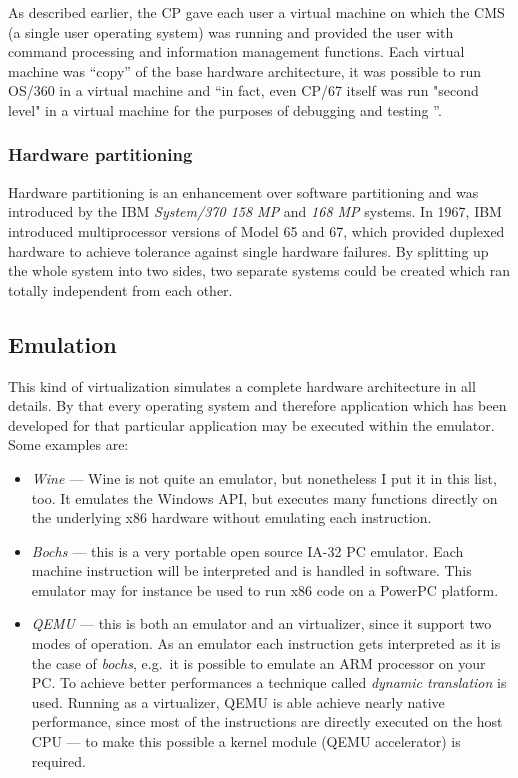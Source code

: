 As described earlier, the CP gave each user a virtual machine on which the
CMS (a  single user  operating system) was  running and provided  the user
with command processing and information management functions. Each virtual
machine was ``copy'' of the base hardware architecture, it was possible to
run OS/360 in  a virtual machine and ``in fact, even  CP/67 itself was run
"second  level" in a  virtual machine  for the  purposes of  debugging and
testing \cite{borden89}''.

\subsubsection{Hardware partitioning}
\label{sec:hardw-part}

Hardware partitioning is an enhancement over software partitioning and was
introduced  by  the  IBM   \emph{System/370  158  MP}  and  \emph{168  MP}
systems. In 1967,  IBM introduced multiprocessor versions of  Model 65 and
67, which  provided duplexed hardware to achieve  tolerance against single
hardware failures.  By  splitting up the whole system  into two sides, two
separate systems could be created  which ran totally independent from each
other.

\subsection{Emulation}
\label{sec:emulation}

This kind of virtualization  simulates a complete hardware architecture in
all  details. By  that every  operating system  and  therefore application
which has been  developed for that particular application  may be executed
within the emulator. Some examples are:
\begin{itemize}
\item  \emph{Wine \cite{wine}}  --- Wine  is  not quite  an emulator,  but
  nonetheless I put it in this list, too. It emulates the Windows API, but
  executes many functions directly  on the underlying x86 hardware without
  emulating each instruction.
\item \emph{Bochs  \cite{bochs}} --- this  is a very portable  open source
  IA-32 PC emulator.  Each machine  instruction will be interpreted and is
  handled in software.  This emulator may for instance be  used to run x86
  code on a PowerPC platform.
\item  \emph{QEMU  \cite{qemu}} ---  this  is  both  an emulator  and  an
  virtualizer, since  it support  two modes of  operation. As  an emulator
  each instruction  gets interpreted  as it is  the case  of \emph{bochs},
  e.g.~it is possible  to emulate an ARM processor on  your PC. To achieve
  better  performances a  technique called  \emph{dynamic  translation} is
  used.   Running as  a virtualizer,  QEMU is  able achieve  nearly native
  performance, since most of the instructions are directly executed on the
  host CPU --- to make this possible a kernel module (QEMU accelerator) is
  required.
\end{itemize}

